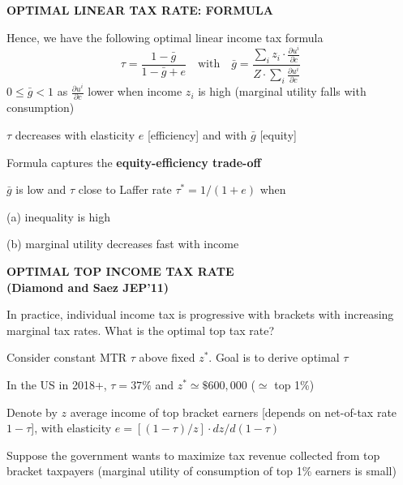 \documentclass[landscape]{slides}
\begin{document}
\begin{slide}
\begin{center}
{\bf OPTIMAL LINEAR TAX RATE: FORMULA}
\end{center}

Hence, we have the following optimal linear income tax formula
\[
\tau= \frac{1-\bar{g}}{1-\bar{g} + e} \quad \mathrm{with} \quad
\bar{g}= \frac{ \sum_i z_i \cdot  \frac{ \partial u^i}{\partial c}   }{Z \cdot \sum_i \frac{ \partial u^i}{\partial c} }
\]
$0\leq \bar{g} <1$ as $\frac{ \partial u^i}{\partial c}$ lower when income $z_i$ is high (marginal utility
falls with consumption)

$\tau$ decreases with elasticity $e$ [efficiency] and with $\bar{g}$ [equity]

Formula captures the \textbf{equity-efficiency trade-off}

$\bar{g}$ is low and $\tau$ close to Laffer rate $\tau^*=1/(1+e)$ when

(a) inequality is high

(b) marginal utility decreases fast with income


\end{slide}


\begin{slide}
\begin{center}
{\bf OPTIMAL TOP INCOME TAX RATE \\ (Diamond and Saez JEP'11)}
\end{center}
In practice, individual income tax is progressive with brackets with increasing
marginal tax rates. What is the optimal top tax rate?

Consider constant MTR $\tau$ above fixed $z^*$. Goal is to
derive optimal $\tau$

In the US in 2018+, $\tau=37\%$ and $z^*\simeq \$600,000$ ($\simeq$ top 1\%)

Denote by
$z$ average income of top bracket earners [depends on net-of-tax rate
$1-\tau$], with elasticity $e=[(1-\tau)/z]\cdot
d z/d(1-\tau)$

Suppose the government wants to maximize tax revenue collected
from top bracket taxpayers (marginal utility of consumption of
top 1\% earners is small)

\end{slide}


\begin{slide}

\end{slide}
\end{document}
